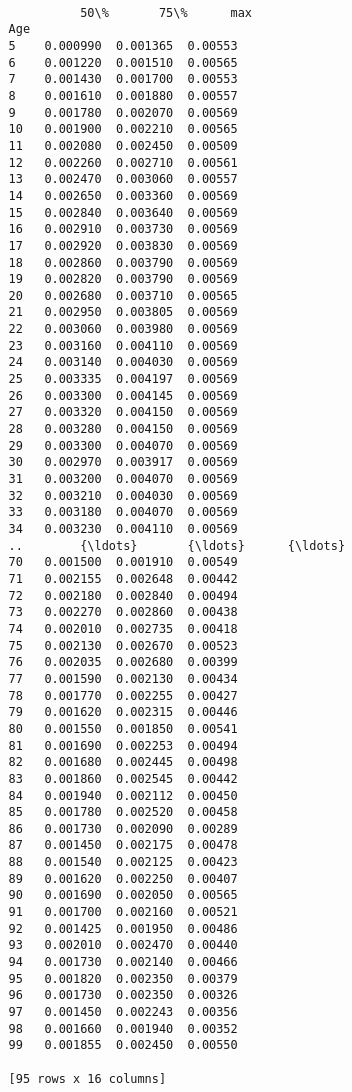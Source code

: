 \documentclass[11pt]{article}
\begin{document}
\begin{Verbatim}[commandchars=\\\{\}]
                                            
                    50\%       75\%      max  
          Age                               
          5    0.000990  0.001365  0.00553  
          6    0.001220  0.001510  0.00565  
          7    0.001430  0.001700  0.00553  
          8    0.001610  0.001880  0.00557  
          9    0.001780  0.002070  0.00569  
          10   0.001900  0.002210  0.00565  
          11   0.002080  0.002450  0.00509  
          12   0.002260  0.002710  0.00561  
          13   0.002470  0.003060  0.00557  
          14   0.002650  0.003360  0.00569  
          15   0.002840  0.003640  0.00569  
          16   0.002910  0.003730  0.00569  
          17   0.002920  0.003830  0.00569  
          18   0.002860  0.003790  0.00569  
          19   0.002820  0.003790  0.00569  
          20   0.002680  0.003710  0.00565  
          21   0.002950  0.003805  0.00569  
          22   0.003060  0.003980  0.00569  
          23   0.003160  0.004110  0.00569  
          24   0.003140  0.004030  0.00569  
          25   0.003335  0.004197  0.00569  
          26   0.003300  0.004145  0.00569  
          27   0.003320  0.004150  0.00569  
          28   0.003280  0.004150  0.00569  
          29   0.003300  0.004070  0.00569  
          30   0.002970  0.003917  0.00569  
          31   0.003200  0.004070  0.00569  
          32   0.003210  0.004030  0.00569  
          33   0.003180  0.004070  0.00569  
          34   0.003230  0.004110  0.00569  
          ..        {\ldots}       {\ldots}      {\ldots}  
          70   0.001500  0.001910  0.00549  
          71   0.002155  0.002648  0.00442  
          72   0.002180  0.002840  0.00494  
          73   0.002270  0.002860  0.00438  
          74   0.002010  0.002735  0.00418  
          75   0.002130  0.002670  0.00523  
          76   0.002035  0.002680  0.00399  
          77   0.001590  0.002130  0.00434  
          78   0.001770  0.002255  0.00427  
          79   0.001620  0.002315  0.00446  
          80   0.001550  0.001850  0.00541  
          81   0.001690  0.002253  0.00494  
          82   0.001680  0.002445  0.00498  
          83   0.001860  0.002545  0.00442  
          84   0.001940  0.002112  0.00450  
          85   0.001780  0.002520  0.00458  
          86   0.001730  0.002090  0.00289  
          87   0.001450  0.002175  0.00478  
          88   0.001540  0.002125  0.00423  
          89   0.001620  0.002250  0.00407  
          90   0.001690  0.002050  0.00565  
          91   0.001700  0.002160  0.00521  
          92   0.001425  0.001950  0.00486  
          93   0.002010  0.002470  0.00440  
          94   0.001730  0.002140  0.00466  
          95   0.001820  0.002350  0.00379  
          96   0.001730  0.002350  0.00326  
          97   0.001450  0.002243  0.00356  
          98   0.001660  0.001940  0.00352  
          99   0.001855  0.002450  0.00550  
          
          [95 rows x 16 columns]
\end{Verbatim}
            
\end{document}
